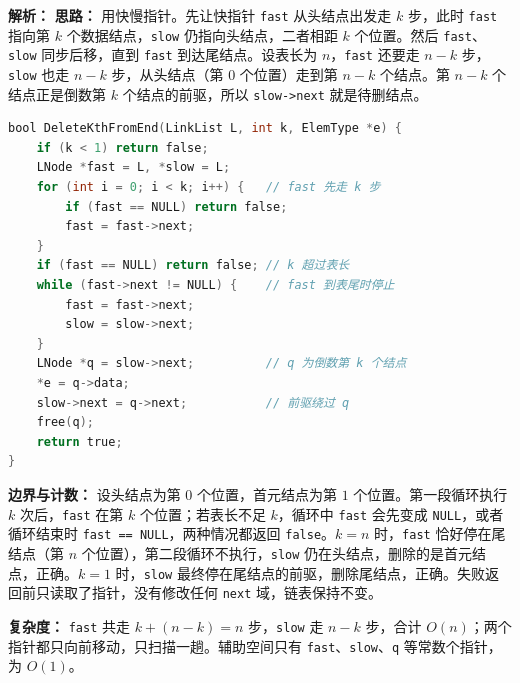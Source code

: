\begin{enumerate}[resume]
\ifshowsolutions\par\noindent\textbf{解析：} \textbf{思路：} 用快慢指针。先让快指针 \texttt{fast} 从头结点出发走 $k$ 步，此时 \texttt{fast} 指向第 $k$ 个数据结点，\texttt{slow} 仍指向头结点，二者相距 $k$ 个位置。然后 \texttt{fast}、\texttt{slow} 同步后移，直到 \texttt{fast} 到达尾结点。设表长为 $n$，\texttt{fast} 还要走 $n-k$ 步，\texttt{slow} 也走 $n-k$ 步，从头结点（第 $0$ 个位置）走到第 $n-k$ 个结点。第 $n-k$ 个结点正是倒数第 $k$ 个结点的前驱，所以 \texttt{slow->next} 就是待删结点。

\begin{lstlisting}[language=C]
bool DeleteKthFromEnd(LinkList L, int k, ElemType *e) {
    if (k < 1) return false;
    LNode *fast = L, *slow = L;
    for (int i = 0; i < k; i++) {   // fast 先走 k 步
        if (fast == NULL) return false;
        fast = fast->next;
    }
    if (fast == NULL) return false; // k 超过表长
    while (fast->next != NULL) {    // fast 到表尾时停止
        fast = fast->next;
        slow = slow->next;
    }
    LNode *q = slow->next;          // q 为倒数第 k 个结点
    *e = q->data;
    slow->next = q->next;           // 前驱绕过 q
    free(q);
    return true;
}
\end{lstlisting}

\textbf{边界与计数：} 设头结点为第 $0$ 个位置，首元结点为第 $1$ 个位置。第一段循环执行 $k$ 次后，\texttt{fast} 在第 $k$ 个位置；若表长不足 $k$，循环中 \texttt{fast} 会先变成 \texttt{NULL}，或者循环结束时 \texttt{fast == NULL}，两种情况都返回 \texttt{false}。$k=n$ 时，\texttt{fast} 恰好停在尾结点（第 $n$ 个位置），第二段循环不执行，\texttt{slow} 仍在头结点，删除的是首元结点，正确。$k=1$ 时，\texttt{slow} 最终停在尾结点的前驱，删除尾结点，正确。失败返回前只读取了指针，没有修改任何 \texttt{next} 域，链表保持不变。

\textbf{复杂度：} \texttt{fast} 共走 $k+(n-k)=n$ 步，\texttt{slow} 走 $n-k$ 步，合计 $O(n)$；两个指针都只向前移动，只扫描一趟。辅助空间只有 \texttt{fast}、\texttt{slow}、\texttt{q} 等常数个指针，为 $O(1)$。\else \answerarea[10] \fi

\end{enumerate}

\vspace{8pt}
